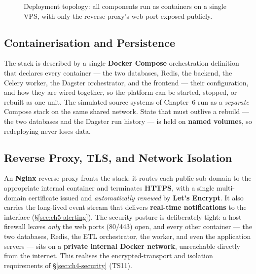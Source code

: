 \begin{figure}[H]
{%
}
\caption{Deployment topology: all components run as containers on a single VPS, with only the reverse
proxy's web port exposed publicly.}
\label{fig:ch5-deploy}
\end{figure}

\subsection{Containerisation and Persistence}

The stack is described by a single \textbf{Docker Compose} orchestration definition that declares every
container --- the two databases, Redis, the backend, the Celery worker, the Dagster orchestrator, and the
frontend --- their configuration, and how they are wired together, so the platform can be started,
stopped, or rebuilt as one unit. The simulated source systems of Chapter~6 run as a \emph{separate}
Compose stack on the same shared network. State that must outlive a rebuild --- the two databases and the
Dagster run history --- is held on \textbf{named volumes}, so redeploying never loses data.

\subsection{Reverse Proxy, TLS, and Network Isolation}

An \textbf{Nginx} reverse proxy fronts the stack: it routes each public sub-domain to the appropriate
internal container and terminates \textbf{HTTPS}, with a single multi-domain certificate issued and
\emph{automatically renewed} by \textbf{Let's Encrypt}. It also carries the long-lived event stream that
delivers \textbf{real-time notifications} to the interface (\S\ref{sec:ch5-alerting}). The security
posture is deliberately tight: a host firewall leaves \emph{only} the web ports (80/443) open, and every
other container --- the two databases, Redis, the ETL orchestrator, the worker, and even the application
servers --- sits on a \textbf{private internal Docker network}, unreachable directly from the internet.
This realises the encrypted-transport and isolation requirements of \S\ref{sec:ch4-security} (TS11).

